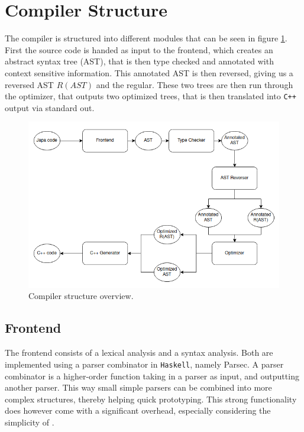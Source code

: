 \section{Compiler Structure \rr}
The \lan compiler is structured into different modules that can be seen in figure
\ref{fig:compiler-overview}. First the \lan source code is handed as input to the frontend,
which creates an abstract syntax tree (AST), that is then type checked and annotated with
context sensitive information. This annotated AST is then reversed, giving us a reversed AST
$R(AST)$ and the regular. These two trees are then run through the optimizer, that outputs
two optimized trees, that is then translated into \texttt{C++} output via standard out.

\begin{figure}[h!]
    \centering
    \includegraphics[scale=0.6]{imgs/compiler-overview.png}
    \caption{Compiler structure overview.}
    \label{fig:compiler-overview}
\end{figure}

\subsection{Frontend \rr}
The frontend consists of a lexical analysis and a syntax analysis. Both are implemented using a
parser combinator in \texttt{Haskell}, namely Parsec. A parser combinator is a higher-order
function taking in a parser as input, and outputting another parser. This way small simple parsers
can be combined into more complex structures, thereby helping quick prototyping. This strong
functionality does however come with a significant overhead, especially considering the simplicity
of \lan \cite{parser}.

